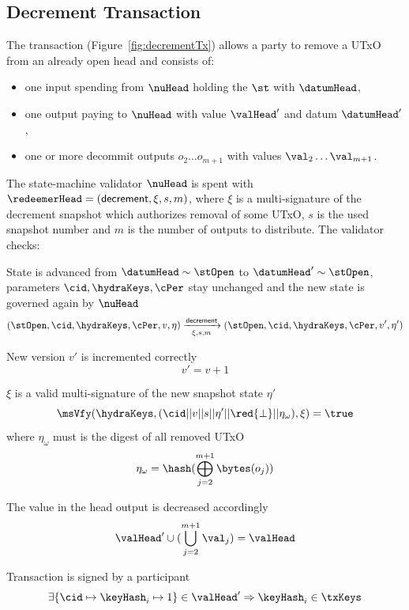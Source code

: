 \subsection{Decrement Transaction}\label{sec:decrement-tx}

\noindent The \mtxDecrement{} transaction (Figure~\ref{fig:decrementTx}) allows
a party to remove a UTxO from an already open head and consists of:

\begin{itemize}
  \item one input spending from $\nuHead$ holding the $\st$ with $\datumHead$,
  \item one output paying to $\nuHead$ with value $\valHead'$ and
  datum $\datumHead'$,
  \item one or more decommit outputs $o_{2} \dots o_{m+1}$ with values $\val_{2} \dots \val_{m+1} $.
\end{itemize}

\noindent The state-machine validator $\nuHead$ is spent with
$\redeemerHead = (\mathsf{decrement}, \xi, s, m)$, where $\xi$ is a multi-signature of
the decrement snapshot which authorizes removal of some UTxO, $s$ is the
used snapshot number and $m$ is the number of outputs to distribute. The
validator checks:
\begin{menumerate}
  \item State is advanced from $\datumHead \sim \stOpen$ to
  $\datumHead' \sim \stOpen$, parameters $\cid,\hydraKeys,\cPer$ stay
  unchanged and the new state is governed again by $\nuHead$
  \[
	(\stOpen,\cid,\hydraKeys,\cPer,v,\eta) \xrightarrow[\xi, s, m]{\mathsf{decrement}} (\stOpen,\cid,\hydraKeys,\cPer,v',\eta')
  \]
  \item New version $v'$ is incremented correctly
  \[
	v' = v + 1
  \]
  \item $\xi$ is a valid multi-signature of the new snapshot state $\eta'$
  \[
	\msVfy(\hydraKeys,(\cid || v || s || \eta' || \red{\bot} || \eta_\omega),\xi) = \true
  \]
  where $\eta_\omega$ must is the digest of all removed UTxO
  \[
	\eta_\omega = \hash(\bigoplus_{j=2}^{m+1} \bytes(o_{j}))
  \]
  \item The value in the head output is decreased accordingly
  \[
	\valHead' \cup (\bigcup_{j=2}^{m+1} \val_{j}) = \valHead
  \]
  \item Transaction is signed by a participant
  \[
	\exists \{\cid \mapsto \keyHash_{i} \mapsto 1\} \in \valHead' \Rightarrow \keyHash_{i} \in \txKeys
  \]
\end{menumerate}

